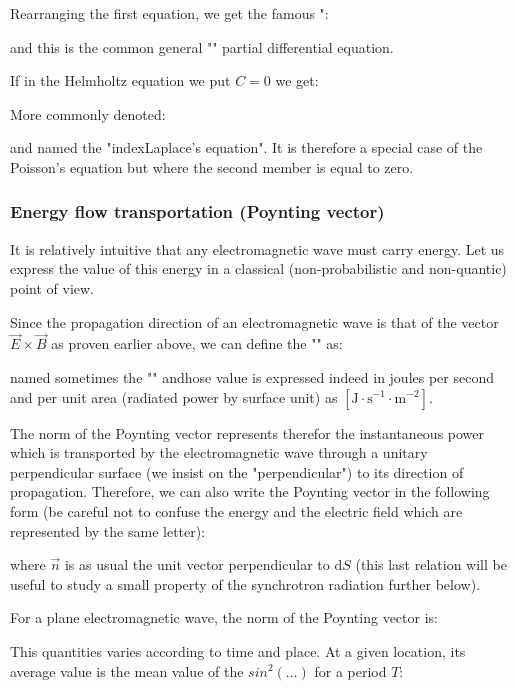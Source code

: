 	Rearranging the first equation, we get the famous ":
	
	and this is the common general "" partial differential equation.
	\begin{tcolorbox}[title=Remarks,colframe=black,arc=10pt]
	If in the Helmholtz equation we put $C=0$ we get:
	
	More commonly denoted:
	
	and named the "index{Laplace's equation}". It is therefore a special case of the Poisson's equation but where the second member is equal to zero.
	\end{tcolorbox}
	
	
	\subsubsection{Energy flow transportation (Poynting vector)}
	It is relatively intuitive that any electromagnetic wave must carry energy. Let us express the value of this energy in a classical (non-probabilistic and non-quantic) point of view.

	Since the propagation direction of an electromagnetic wave is that of the vector $\vec{E}\times\vec{B}$ as proven earlier above, we can define the "" as:
	
	named sometimes the "" andhose value is expressed indeed in joules per second and per unit area (radiated power by surface unit) as $[\text{J}\cdot\text{s}^{-1}\cdot\text{m}^{-2}]$.

	The norm of the Poynting vector represents therefor the instantaneous power which is transported by the electromagnetic wave through a unitary perpendicular surface (we insist on the "perpendicular") to its direction of propagation. Therefore, we can also write the Poynting vector in the following form (be careful not to confuse the energy and the electric field which are represented by the same letter):
	
	where $\vec{n}$ is as usual the unit vector perpendicular to $\mathrm{d}S$ (this last relation will be useful to study a small property of the synchrotron radiation further below).

	For a plane electromagnetic wave, the norm of the Poynting vector is:
	
	This quantities varies according to time and place. At a given location, its average value is the mean value of the $sin^2(\ldots)$ for a period $T$:
	
